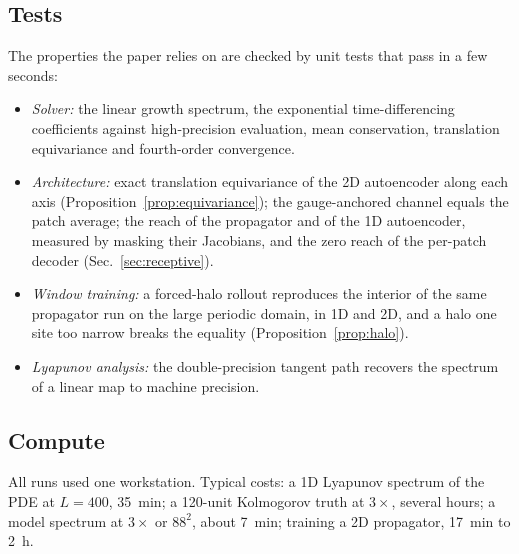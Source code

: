 \subsection{Tests}

The properties the paper relies on are checked by unit tests that pass in
a few seconds:
\begin{itemize}
\item \emph{Solver:} the linear growth spectrum, the exponential
  time-differencing coefficients against high-precision evaluation, mean
  conservation, translation equivariance and fourth-order convergence.
\item \emph{Architecture:} exact translation equivariance of the 2D
  autoencoder along each axis (Proposition~\ref{prop:equivariance}); the
  gauge-anchored channel equals the patch average; the reach of the
  propagator and of the 1D autoencoder, measured by masking their
  Jacobians, and the zero reach of the per-patch decoder
  (Sec.~\ref{sec:receptive}).
\item \emph{Window training:} a forced-halo rollout reproduces the
  interior of the same propagator run on the large periodic domain, in 1D
  and 2D, and a halo one site too narrow breaks the equality
  (Proposition~\ref{prop:halo}).
\item \emph{Lyapunov analysis:} the double-precision tangent path
  recovers the spectrum of a linear map to machine precision.
\end{itemize}

\subsection{Compute}

All runs used one workstation. Typical costs: a 1D Lyapunov spectrum of
the PDE at $L=400$, 35~min; a 120-unit Kolmogorov truth at $3\times$, several
hours; a model spectrum at $3\times$ or $88^2$, about 7~min; training a 2D
propagator, 17~min to 2~h.

